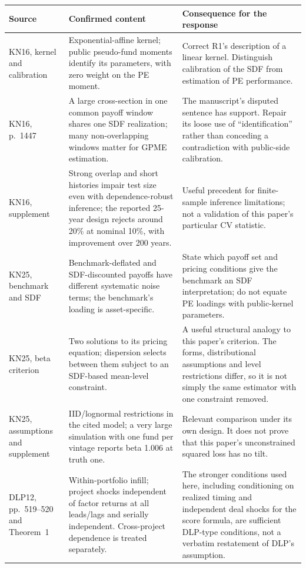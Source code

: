 \documentclass[11pt]{article}
\theoremstyle{plain}
\theoremstyle{definition}
\begin{document}
{\small
\begin{longtable}{@{}L{2.3cm}L{6.3cm}L{6.7cm}@{}}
\toprule
Source & Confirmed content & Consequence for the response\\
\midrule
\endhead
KN16, kernel and calibration & Exponential-affine kernel; public pseudo-fund moments identify its parameters, with zero weight on the PE moment. & Correct R1's description of a linear kernel. Distinguish calibration of the SDF from estimation of PE performance.\\
KN16, p.~1447 & A large cross-section in one common payoff window shares one SDF realization; many non-overlapping windows matter for GPME estimation. & The manuscript's disputed sentence has support. Repair its loose use of ``identification'' rather than conceding a contradiction with public-side calibration.\\
KN16, supplement & Strong overlap and short histories impair test size even with dependence-robust inference; the reported 25-year design rejects around 20\% at nominal 10\%, with improvement over 200 years. & Useful precedent for finite-sample inference limitations; not a validation of this paper's particular CV statistic.\\
KN25, benchmark and SDF & Benchmark-deflated and SDF-discounted payoffs have different systematic noise terms; the benchmark's loading is asset-specific. & State which payoff set and pricing conditions give the benchmark an SDF interpretation; do not equate PE loadings with public-kernel parameters.\\
KN25, beta criterion & Two solutions to its pricing equation; dispersion selects between them subject to an SDF-based mean-level constraint. & A useful structural analogy to this paper's criterion. The forms, distributional assumptions and level restrictions differ, so it is not simply the same estimator with one constraint removed.\\
KN25, assumptions and supplement & IID/lognormal restrictions in the cited model; a very large simulation with one fund per vintage reports beta 1.006 at truth one. & Relevant comparison under its own design. It does not prove that this paper's unconstrained squared loss has no tilt.\\
DLP12, pp.~519--520 and Theorem~1 & Within-portfolio infill; project shocks independent of factor returns at all leads/lags and serially independent. Cross-project dependence is treated separately. & The stronger conditions used here, including conditioning on realized timing and independent deal shocks for the score formula, are sufficient DLP-type conditions, not a verbatim restatement of DLP's assumption.\\

\end{longtable}}
\end{document}
